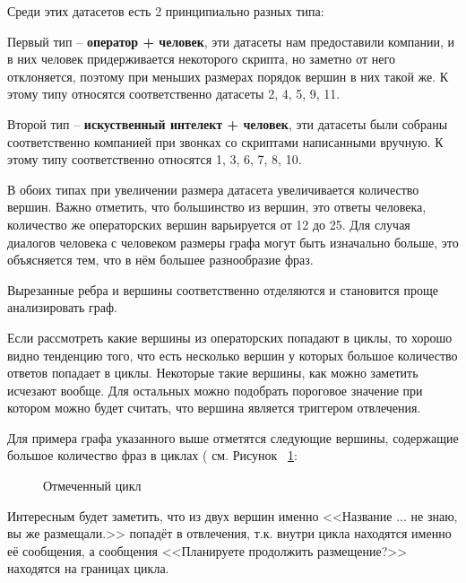 \documentclass[times,specification,annotation]{itmo-student-thesis}
\begin{document}
	Среди этих датасетов есть 2 принципиально разных типа:
	
	Первый тип -- \textbf{оператор + человек}, эти датасеты нам предоставили компании, и в них человек придерживается некоторого скрипта, но заметно от него отклоняется, поэтому при меньших размерах порядок вершин в них такой же. К этому типу относятся соответственно датасеты 2, 4, 5, 9, 11.
	
	Второй тип -- \textbf{искуственный интелект + человек}, эти датасеты были собраны соответственно компанией при звонках со скриптами написанными вручную. К этому типу соответственно относятся 1, 3, 6, 7, 8, 10.
	
	В обоих типах при увеличении размера датасета увеличивается количество вершин. Важно отметить, что большинство из вершин, это ответы человека, количество же операторских вершин варьируется от 12 до 25. Для случая диалогов человека с человеком размеры графа могут быть изначально больше, это объясняется тем, что в нём большее разнообразие фраз.
	
	Вырезанные ребра и вершины соответственно отделяются и становится проще анализировать граф.
	
	Если рассмотреть какие вершины из операторских попадают в циклы, то хорошо видно тенденцию того, что есть несколько вершин у которых большое количество ответов попадает в циклы. Некоторые такие вершины, как можно заметить исчезают вообще. Для остальных можно подобрать пороговое значение при котором можно будет считать, что вершина является триггером отвлечения.
	
	Для примера графа указанного выше отметятся следующие вершины, содержащие большое количество фраз в циклах (  см. Рисунок ~\ref{fig:adapt:graph:cycles}:
	
	\begin{figure}[H]
		\caption{Отмеченный цикл}
		\label{fig:adapt:graph:cycles}
	\end{figure}

	Интересным будет заметить, что из двух вершин именно <<Название ... не знаю, вы же размещали.>> попадёт в отвлечения, т.к. внутри цикла находятся именно её сообщения, а сообщения <<Планируете продолжить размещение?>> находятся на границах цикла. 
	
\end{document}
